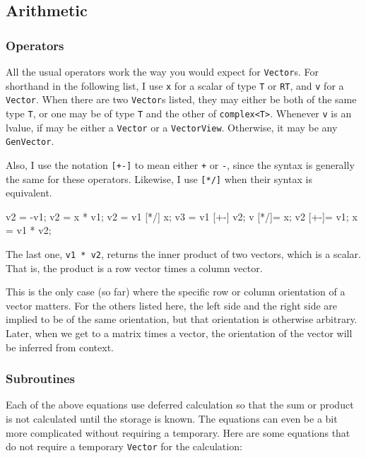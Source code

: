 \documentclass[twoside,letterpaper,11pt]{article}
\renewcommand{\tt}[1]{{\lstinline {#1}}}
\begin{document}
\subsection{Arithmetic}

\subsubsection{Operators}

All the usual operators work the way you would expect for \tt{Vector}s.  For shorthand in the 
following list, I use \tt{x} for a scalar of type \tt{T} or \tt{RT}, and
\tt{v} for a \tt{Vector}.  When there are two \tt{Vector}s
listed, they may either be both of the same type \tt{T}, or one may be of type 
\tt{T} and the other of \tt{complex<T>}.  Whenever \tt{v} is an lvalue,
if may be either a \tt{Vector} or a \tt{VectorView}.  Otherwise, it may be any \tt{GenVector}.

Also, I use the notation \tt{[+-]} to mean either \tt{+} or \tt{-}, since
the syntax is generally the same for these operators.
Likewise, I use \tt{[*/]} when their syntax is equivalent.

\begin{tmvcode}
v2 = -v1;
v2 = x * v1;
v2 = v1 [*/] x;
v3 = v1 [+-] v2;
v [*/]= x;
v2 [+-]= v1;
x = v1 * v2;
\end{tmvcode}
The last one, \tt{v1 * v2},
returns the inner product of two vectors, which is a scalar.  That is, the product
is a row vector times a column vector.  

This is the only case (so far)
where the specific row or column orientation of a vector matters.  For the others
listed here, the left side and the right side are implied to be of the same orientation, but
that orientation is otherwise arbitrary.
Later, when we get to a matrix times a vector, the orientation 
of the vector will be inferred from context.

\subsubsection{Subroutines}

Each of the above equations use deferred calculation so that the sum or product is not calculated
until the storage is known.  The equations can even be a bit more complicated without 
requiring a temporary.  Here are some equations that do not require a temporary 
\tt{Vector} for the calculation:
\end{document}
